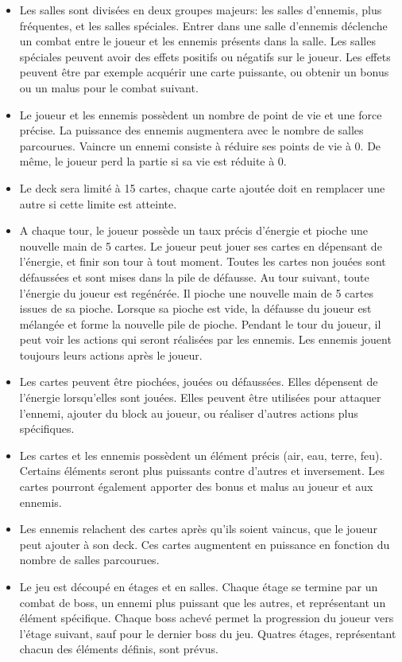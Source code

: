 \begin{itemize}
    \item Les salles sont divisées en deux groupes majeurs: les salles d'ennemis, plus fréquentes, et les salles spéciales. Entrer dans une salle d'ennemis déclenche un combat entre le joueur et les ennemis présents dans la salle. Les salles spéciales peuvent avoir des effets positifs ou négatifs sur le joueur. Les effets peuvent être par exemple acquérir une carte puissante, ou obtenir un bonus ou un malus pour le combat suivant.
    \item Le joueur et les ennemis possèdent un nombre de point de vie et une force précise. La puissance des ennemis augmentera avec le nombre de salles parcourues. Vaincre un ennemi consiste à réduire ses points de vie à 0. De même, le joueur perd la partie si sa vie est réduite à 0.
    \item Le deck sera limité à 15 cartes, chaque carte ajoutée doit en remplacer une autre si cette limite est atteinte.
    \item A chaque tour, le joueur possède un taux précis d'énergie et pioche une nouvelle main de 5 cartes. Le joueur peut jouer ses cartes en dépensant de l'énergie, et finir son tour à tout moment. Toutes les cartes non jouées sont défaussées et sont mises dans la pile de défausse. Au tour suivant, toute l'énergie du joueur est regénérée. Il pioche une nouvelle main de 5 cartes issues de sa pioche. Lorsque sa pioche est vide, la défausse du joueur est mélangée et forme la nouvelle pile de pioche. Pendant le tour du joueur, il peut voir les actions qui seront réalisées par les ennemis. Les ennemis jouent toujours leurs actions après le joueur.
    \item Les cartes peuvent être piochées, jouées ou défaussées. Elles dépensent de l'énergie lorsqu'elles sont jouées. Elles peuvent être utilisées pour attaquer l'ennemi, ajouter du block au joueur, ou réaliser d'autres actions plus spécifiques. 
    \item Les cartes et les ennemis possèdent un élément précis (air, eau, terre, feu). Certains éléments seront plus puissants contre d'autres et inversement. Les cartes pourront également apporter des bonus et malus au joueur et aux ennemis.
    \item Les ennemis relachent des cartes après qu'ils soient vaincus, que le joueur peut ajouter à son deck. Ces cartes augmentent en puissance en fonction du nombre de salles parcourues.
    \item Le jeu est découpé en étages et en salles. Chaque étage se termine par un combat de boss, un ennemi plus puissant que les autres, et représentant un élément spécifique. Chaque boss achevé permet la progression du joueur vers l'étage suivant, sauf pour le dernier boss du jeu. Quatres étages, représentant chacun des éléments définis, sont prévus. 
    
\end{itemize}


